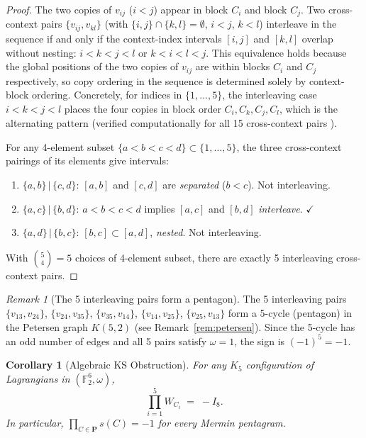 \documentclass[11pt,a4paper]{article}
\newtheorem{corollary}[theorem]{Corollary}
\theoremstyle{remark}
\newtheorem{remark}[theorem]{Remark}
\begin{document}
\begin{proof}
The two copies of $v_{ij}$ ($i < j$) appear in block $C_i$ and
block $C_j$.
Two cross-context pairs $\{v_{ij}, v_{kl}\}$
(with $\{i,j\}\cap\{k,l\}=\emptyset$, $i<j$, $k<l$) interleave
in the sequence if and only if the context-index intervals $[i,j]$ and
$[k,l]$ overlap without nesting: $i < k < j < l$ or $k < i < l < j$.
This equivalence holds because the global positions of the two copies
of $v_{ij}$ are within blocks $C_i$ and $C_j$ respectively, so copy
ordering in the sequence is determined solely by context-block ordering.
Concretely, for indices in $\{1,\ldots,5\}$, the interleaving case
$i < k < j < l$ places the four copies in block order
$C_i, C_k, C_j, C_l$, which is the alternating pattern
(verified computationally for all 15 cross-context pairs \cite{PaperXVIIsuppl}).

For any 4-element subset $\{a < b < c < d\} \subset \{1,\ldots,5\}$,
the three cross-context pairings of its elements give intervals:
\begin{enumerate}
  \item $\{a,b\}\,|\,\{c,d\}$: $[a,b]$ and $[c,d]$ are
        \emph{separated} ($b < c$). Not interleaving.
  \item $\{a,c\}\,|\,\{b,d\}$: $a < b < c < d$ implies
        $[a,c]$ and $[b,d]$ \emph{interleave}. $\checkmark$
  \item $\{a,d\}\,|\,\{b,c\}$: $[b,c] \subset [a,d]$, \emph{nested}.
        Not interleaving.
\end{enumerate}
With $\binom{5}{4} = 5$ choices of 4-element subset, there are exactly
5 interleaving cross-context pairs.
\end{proof}

\begin{remark}[The 5 interleaving pairs form a pentagon]
\label{rem:pentagon}
The 5 interleaving pairs $\{v_{13},v_{24}\}$, $\{v_{24},v_{35}\}$,
$\{v_{35},v_{14}\}$, $\{v_{14},v_{25}\}$, $\{v_{25},v_{13}\}$
form a 5-cycle (pentagon) in the Petersen graph $K(5,2)$
(see Remark~\ref{rem:petersen}).
Since the 5-cycle has an odd number of edges and all 5 pairs
satisfy $\omega = 1$, the sign is $(-1)^5 = -1$.
\end{remark}

\begin{corollary}[Algebraic KS Obstruction]\label{cor:ks}
For any $K_5$ configuration of Lagrangians in $(\mathbb{F}_2^6, \omega)$,
\[
  \prod_{i=1}^5 W_{C_i} \;=\; -I_8.
\]
In particular, $\prod_{C \in \mathbf{P}} s(C) = -1$ for every Mermin pentagram.
\end{corollary}
\end{document}

